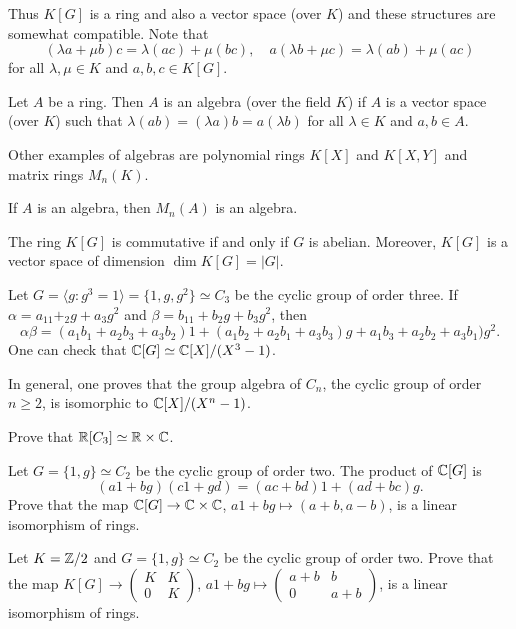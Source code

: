 Thus $K[G]$ is a ring and also a vector space (over $K$) and these structures
are somewhat compatible. Note that
\[
(\lambda a+\mu b)c=\lambda (ac)+\mu (bc),\quad
a(\lambda b+\mu c)=\lambda (ab)+\mu (ac)
\]
for all $\lambda,\mu\in K$ and $a,b,c\in K[G]$. 

\begin{definition}
Let $A$ be a ring. Then $A$ is an algebra (over the field $K$) if $A$ is a vector space (over $K$)
such that $\lambda(ab)=(\lambda a)b=a(\lambda b)$ for all $\lambda\in K$ and $a,b\in A$. 
\end{definition}

Other examples of algebras are 
polynomial rings $K[X]$ and $K[X,Y]$ and matrix rings $M_n(K)$.  

\begin{example}
	If $A$ is an algebra, then $M_n(A)$ is an algebra.	
\end{example}

The ring $K[G]$ is commutative if and only if $G$ is abelian. Moreover,
$K[G]$ is a vector space of dimension $\dim K[G]=|G|$.

\begin{example}
	Let $G=\langle g:g^3=1\rangle=\{1,g,g^2\}\simeq C_3$ be the cyclic group of order three. 
	If $\alpha=a_11+_2g+a_3g^2$ and $\beta=b_11+b_2g+b_3g^2$, then
	\[
		\alpha\beta=(a_1b_1+a_2b_3+a_3b_2)1+(a_1b_2+a_2b_1+a_3b_3)g+a_1b_3+a_2b_2+a_3b_1)g^2.
	\]
	One can check that $\mathbb{C}[G]\simeq\mathbb{C}[X]/(X^3-1)$. 
\end{example}

In general, one proves that the group algebra of $C_n$, the cyclic group of order $n\geq2$, 
is isomorphic to $\mathbb{C}[X]/(X^n-1)$.

\begin{exercise}
\label{xca:RC3}
	Prove that $\mathbb{R}[C_3]\simeq\mathbb{R}\times\mathbb{C}$. 	
\end{exercise}

\begin{exercise}
	Let $G=\{1,g\}\simeq C_2$ be the cyclic group of order two. The product
	of $\mathbb{C}[G]$ is 
	\[
	(a1+bg)(c1+gd)=(ac+bd)1+(ad+bc)g.
	\]
	Prove that the map $\mathbb{C}[G]\to \mathbb{C}\times \mathbb{C}$, $a1+bg\mapsto (a+b,a-b)$, 
	is a linear isomorphism of rings. 
\end{exercise}

\begin{exercise}
	Let $K=\mathbb{Z}/2$ and $G=\{1,g\}\simeq C_2$ be the cyclic group of order two. 
	Prove that the map $K[G]\to\begin{pmatrix}
		K&K\\
		0&K
	\end{pmatrix}$, $a1+bg\mapsto\begin{pmatrix}
		a+b&b\\
		0&a+b		
	\end{pmatrix}$, is a linear isomorphism of rings.
\end{exercise}


